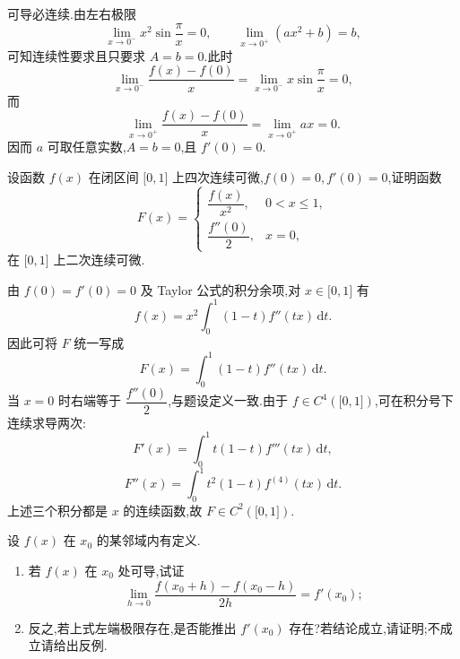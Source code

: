 \begin{solution}
    可导必连续.由左右极限
    \[
        \displaystyle\lim\limits_{x\to0^-}x^2\sin\dfrac{\pi}{x}=0,
        \qquad
        \lim\limits_{x\to0^+}(ax^2+b)=b,
    \]
    可知连续性要求且只要求 $A=b=0$.此时
    \[
        \displaystyle\lim\limits_{x\to0^-}\dfrac{f(x)-f(0)}{x}
        =\lim\limits_{x\to0^-}x\sin\dfrac{\pi}{x}=0,
    \]
    而
    \[
        \displaystyle\lim\limits_{x\to0^+}\dfrac{f(x)-f(0)}{x}
        =\lim\limits_{x\to0^+}ax=0.
    \]
    因而 $a$ 可取任意实数,$A=b=0$,且 $f'(0)=0$.
\end{solution}

\begin{example}
    设函数 $f(x)$ 在闭区间 $\lbrack 0,1\rbrack$ 上四次连续可微,$f(0)=0,f'(0)=0$,证明函数
    \[
        F(x)=
        \begin{cases}
            \dfrac{f(x)}{x^2}, & 0<x\leq1, \\
            \dfrac{f''(0)}{2}, & x=0,
        \end{cases}
    \]
    在 $\lbrack 0,1\rbrack$ 上二次连续可微.
\end{example}
\exampleblank

\begin{solution}
    由 $f(0)=f'(0)=0$ 及 Taylor 公式的积分余项,对 $x\in\lbrack0,1\rbrack$ 有
    \[
        f(x)=x^2\int_0^1(1-t)f''(tx)\,\mathrm{d}t.
    \]
    因此可将 $F$ 统一写成
    \[
        F(x)=\int_0^1(1-t)f''(tx)\,\mathrm{d}t.
    \]
    当 $x=0$ 时右端等于 $\dfrac{f''(0)}{2}$,与题设定义一致.由于 $f\in C^4(\lbrack0,1\rbrack)$,可在积分号下连续求导两次:
    \[
        F'(x)=\int_0^1t(1-t)f'''(tx)\,\mathrm{d}t,
    \]
    \[
        F''(x)=\int_0^1t^2(1-t)f^{(4)}(tx)\,\mathrm{d}t.
    \]
    上述三个积分都是 $x$ 的连续函数,故 $F\in C^2(\lbrack0,1\rbrack)$.
\end{solution}

\begin{example}
    设 $f(x)$ 在 $x_0$ 的某邻域内有定义.
    \begin{enumerate}
        \item 若 $f(x)$ 在 $x_0$ 处可导,试证
              \[
                  \displaystyle\lim\limits_{h\to0}
                  \dfrac{f(x_0+h)-f(x_0-h)}{2h}=f'(x_0);
              \]
        \item 反之,若上式左端极限存在,是否能推出 $f'(x_0)$ 存在?若结论成立,请证明;不成立请给出反例.
    \end{enumerate}
\end{example}
\exampleblank

